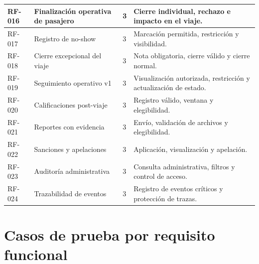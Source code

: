 \documentclass[12pt]{article}
\begin{document}
\begin{center}
\begin{longtable}{|P{1.6cm}|P{4.3cm}|P{2cm}|P{6.8cm}|}
\hline
RF-016 & Finalizaci\'on operativa de pasajero & 3 & Cierre individual, rechazo e impacto en el viaje. \\
\hline
RF-017 & Registro de no-show & 3 & Marcaci\'on permitida, restricci\'on y visibilidad. \\
\hline
RF-018 & Cierre excepcional del viaje & 3 & Nota obligatoria, cierre v\'alido y cierre normal. \\
\hline
RF-019 & Seguimiento operativo v1 & 3 & Visualizaci\'on autorizada, restricci\'on y actualizaci\'on de estado. \\
\hline
RF-020 & Calificaciones post-viaje & 3 & Registro v\'alido, ventana y elegibilidad. \\
\hline
RF-021 & Reportes con evidencia & 3 & Env\'io, validaci\'on de archivos y elegibilidad. \\
\hline
RF-022 & Sanciones y apelaciones & 3 & Aplicaci\'on, visualizaci\'on y apelaci\'on. \\
\hline
RF-023 & Auditor\'ia administrativa & 3 & Consulta administrativa, filtros y control de acceso. \\
\hline
RF-024 & Trazabilidad de eventos & 3 & Registro de eventos cr\'iticos y protecci\'on de trazas. \\
\hline
\end{longtable}
\end{center}

\section{Casos de prueba por requisito funcional}
\end{document}

